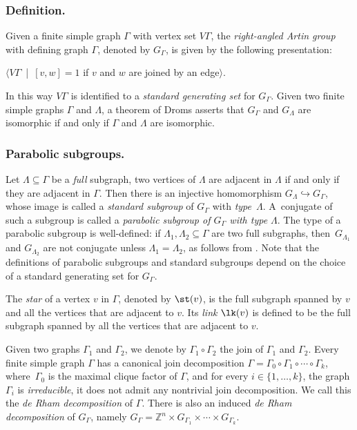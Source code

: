 \label{sec:review}

\subsubsection*{Definition.} Given a finite simple graph $\Gamma$ with vertex set $V\Gamma$, the \emph{right-angled Artin group} with defining graph $\Gamma$, denoted by $G_\Gamma$, is given by the following presentation:
\begin{center}
$\langle V\Gamma$\ |\ $[v,w]=1$ if $v$ and $w$ are joined by an edge$\rangle$.
\end{center}
In this way $V\Gamma$ is identified to a \textit{standard generating set} for $G_\Gamma$. Given two finite simple graphs $\Gamma$ and $\Lambda$, a theorem of Droms \cite{Dro} asserts that $G_\Gamma$ and $G_\Lambda$ are isomorphic if and only if $\Gamma$ and $\Lambda$ are isomorphic.

\subsubsection*{Parabolic subgroups.} Let $\Lambda\!\subseteq\!\Gamma$ be a \emph{full} subgraph, \ie two vertices of $\Lambda$ are adja\-cent in $\Lambda$ if and only if they are adjacent in $\Gamma$. Then there is an injective homomorphism $G_{\Lambda}\hookrightarrow G_{\Gamma}$, whose image is called a \emph{standard subgroup} of $G_{\Gamma}$ with \emph{type}~$\Lambda$. A~conjugate of such a subgroup is called a \emph{parabolic subgroup of $G_\Gamma$ with type $\Lambda$}. The type of a parabolic subgroup is well-defined: if $\Lambda_1,\Lambda_2\subseteq\Gamma$ are two full subgraphs, then~$G_{\Lambda_1}$ and $G_{\Lambda_2}$ are not conjugate unless $\Lambda_1=\Lambda_2$, as follows from \hbox{\cite[Prop.\,2.2]{charney2007automorphisms}}. Note that the definitions of parabolic subgroups and standard subgroups depend on the choice of a standard generating set for $G_\Gamma$.

The \emph{star} of a vertex $v$ in $\Gamma$, denoted by $\st(v)$, is the full subgraph spanned by $v$ and all the vertices that are adjacent to $v$. Its \emph{link} $\lk(v)$ is defined to be the full subgraph spanned by all the vertices that are adjacent to $v$.

Given two graphs $\Gamma_1$ and $\Gamma_2$, we denote by $\Gamma_1\circ \Gamma_2$ the join of $\Gamma_1$ and $\Gamma_2$. Every finite simple graph $\Gamma$ has a canonical join decomposition $\Gamma=\Gamma_0\circ \Gamma_1\circ\cdots\circ\Gamma_k$, where~$\Gamma_0$ is the maximal clique factor of $\Gamma$, and for every $i\in\{1,\dots,k\}$, the graph $\Gamma_i$ is \emph{irreducible}, \ie it does not admit any nontrivial join decomposition. We call this the \emph{de Rham decomposition} of $\Gamma$. There is also an induced \emph{de Rham decomposition} of $G_\Gamma$, namely $G_\Gamma=\mathbb Z^n\times G_{\Gamma_1}\times\cdots\times G_{\Gamma_k}$.

